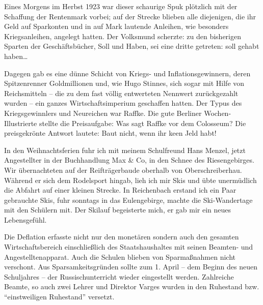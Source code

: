 Eines Morgens im Herbst 1923 war dieser schaurige Spuk plötzlich mit der Schaffung der Rentenmark vorbei; auf der Strecke blieben alle diejenigen, die ihr Geld auf Sparkonten und in auf Mark lautende Anleihen, wie besonders Kriegsanleihen, angelegt hatten. Der Volksmund scherzte: zu den bisherigen Sparten der Geschäftsbücher, Soll und Haben, sei eine dritte getreten: soll gehabt haben\dots

Dagegen gab es eine dünne Schicht von Kriegs- und Inflationsgewinnern, deren Spitzenrenner Goldmillionen und, wie Hugo Stinnes, sich sogar mit Hilfe von Reichsmitteln -- die zu dem fast völlig entwerteten Nennwert zurückgezahlt wurden -- ein ganzes Wirtschaftsimperium geschaffen hatten. Der Typus des Kriegsgewinnlers und Neureichen war Raffke. Die gute Berliner Wochen-Illustrierte stellte die Preisaufgabe: Was sagt Raffke vor dem Colosseum? Die preisgekrönte Antwort lautete: Baut nicht, wenn ihr keen Jeld habt!

In den Weihnachtsferien fuhr ich mit meinem Schulfreund Hans Menzel, jetzt Angestellter in der Buchhandlung Max \& Co, in den Schnee des Riesengebirges. Wir übernachteten auf der Reifträgerbaude oberhalb von Oberschreiberhau. Während er sich dem Rodelsport hingab, lieh ich mir Skis und übte unermüdlich die Abfahrt auf einer kleinen Strecke. In Reichenbach erstand ich ein Paar gebrauchte Skis, fuhr sonntags in das Eulengebirge, machte die Ski-Wandertage mit den Schülern mit. Der Skilauf begeisterte mich, er gab mir ein neues Lebensgefühl.

Die Deflation erfasste nicht nur den monetären sondern auch den gesamten Wirtschaftsbereich einschließlich des Staatshaushaltes mit seinen Beamten- und Angestelltenapparat. Auch die Schulen blieben von Sparmaßnahmen nicht verschont. Aus Sparsamkeitsgründen sollte zum 1. April -- dem Beginn des neuen Schuljahres -- der Russischunterricht wieder eingestellt werden. Zahlreiche Beamte, so auch zwei Lehrer und Direktor Varges wurden in den Ruhestand bzw. \enquote{einstweiligen Ruhestand} versetzt.

